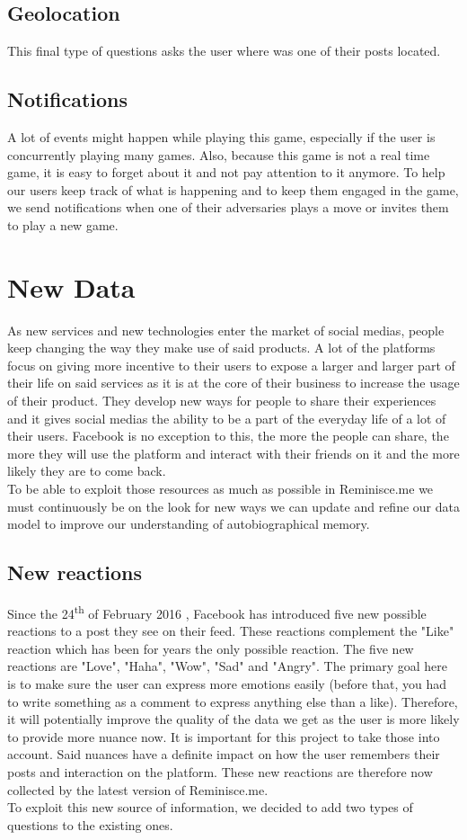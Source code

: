 \subsection{Geolocation}
This final type of questions asks the user where was one of their posts located.

\subsection{Notifications}
A lot of events might happen while playing this game, especially if the user is concurrently playing many games. Also, because this game is not a real time game, it is easy to forget about it and not pay attention to it anymore. To help our users keep track of what is happening and to keep them engaged in the game, we send notifications when one of their adversaries plays a move or invites them to play a new game.

\section{New Data}
As new services and new technologies enter the market of social medias, people keep changing the way they make use of said products. A lot of the platforms focus on giving more incentive to their users to expose a larger and larger part of their life on said services as it is at the core of their business to increase the usage of their product. They develop new ways for people to share their experiences and it gives social medias the ability to be a part of the everyday life of a lot of their users. Facebook is no exception to this, the more the people can share, the more they will use the platform and interact with their friends on it and the more likely they are to come back.\\To be able to exploit those resources as much as possible in Reminisce.me we must continuously be on the look for new ways we can update and refine our data model to improve our understanding of autobiographical memory.
\subsection{New reactions}\label{subsec:newreacts}
Since the 24\textsuperscript{th} of February 2016 \cite{reactrelease}, Facebook has introduced five new possible reactions to a post they see on their feed. These reactions complement the "Like" reaction which has been for years the only possible reaction. The five new reactions are "Love", "Haha", "Wow", "Sad" and "Angry". The primary goal here is to make sure the user can express more emotions easily (before that, you had to write something as a comment to express anything else than a like). Therefore, it will potentially improve the quality of the data we get as the user is more likely to provide more nuance now. It is important for this project to take those into account. Said nuances have a definite impact on how the user remembers their posts and interaction on the platform. These new reactions are therefore now collected by the latest version of Reminisce.me.\\
To exploit this new source of information, we decided to add two types of questions to the existing ones.

